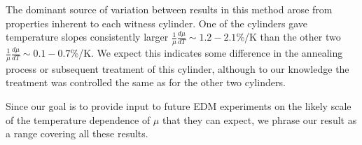 





The dominant source of variation between results in this method arose
from properties inherent to each witness cylinder.  One of the
cylinders gave temperature slopes consistently larger
$\frac{1}{\mu}\frac{d\mu}{dT}\sim 1.2-2.1$\%/K than the other two
$\frac{1}{\mu}\frac{d\mu}{dT}\sim 0.1-0.7$\%/K.  We expect this indicates
some difference in the annealing process or subsequent treatment of
this cylinder, although to our knowledge the treatment was controlled
the same as for the other two cylinders.

Since our goal is to provide input to future EDM experiments on the
likely scale of the temperature dependence of $\mu$ that they can
expect, we phrase our result as a range covering all these results.



